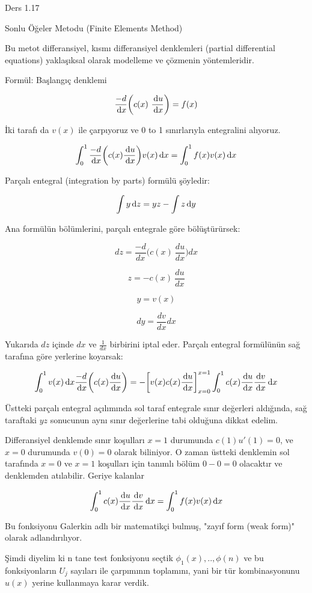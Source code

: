 \documentclass[12pt,fleqn]{article}\usepackage{../../common}
\begin{document}
Ders 1.17

Sonlu Öğeler Metodu (Finite Elements Method)

Bu metot differansiyel, kısmı differansiyel denklemleri (partial
differential equations) yaklaşıksal olarak modelleme ve çözmenin
yöntemleridir.

Formül: Başlangıç denklemi

$$ \frac{-d}{\,\mathrm{d} x} \bigg( c(x) \ \frac{\,\mathrm{d} u}{\,\mathrm{d} x} \bigg) = f(x) $$

İki tarafı da  $v(x)$ ile çarpıyoruz ve 0 to 1 sınırlarıyla entegralini alıyoruz.

$$
\int_0^1 \frac{-d}{\,\mathrm{d} x} \bigg( c(x) \frac{\,\mathrm{d} u}{\,\mathrm{d} x} \bigg) v(x)\,\mathrm{d} x
= \int_0^1 f(x)v(x) \,\mathrm{d} x
$$

Parçalı entegral (integration by parts) formülü şöyledir:

$$ \int y \,\mathrm{d} z = y  z - \int z \,\mathrm{d} y $$

Ana formülün bölümlerini, parçalı entegrale göre bölüştürürsek:

$$ dz = \frac{-d}{dx} \bigg( c(x) \ \frac{du}{dx} \bigg) dx  $$

$$ z = - c(x) \ \frac{du}{dx}  $$

$$ y = v(x)  $$

$$ dy = \frac{dv}{dx}dx $$

Yukarıda $dz$ içinde $dx$ ve $\frac{1}{dx}$ birbirini iptal eder. Parçalı
entegral formülünün sağ tarafına göre yerlerine koyarsak:

$$
\int_0^1 v(x)\,\mathrm{d} x \frac{-d}{\,\mathrm{d} x} \bigg( c(x) \frac{\,\mathrm{d} u}{\,\mathrm{d} x} \bigg)
= - \bigg[ v(x) c(x) \frac{\,\mathrm{d} u}{\,\mathrm{d} x} \bigg]_{x=0}^{x=1} \int_0^1 c(x) \frac{\,\mathrm{d} u}{\,\mathrm{d} x} \frac{\,\mathrm{d} v}{\,\mathrm{d} x} \,\mathrm{d} x
$$

Üstteki parçalı entegral açılımında sol taraf entegrale sınır
değerleri aldığında, sağ taraftaki $yz$ sonucunun aynı sınır
değerlerine tabi olduğuna dikkat edelim.

Differansiyel denklemde sınır koşulları $x=1$ durumunda $c(1)u'(1)=0$,
ve $x=0$ durumunda $v(0)=0$ olarak biliniyor. O zaman üstteki
denklemin sol tarafında $x=0$ ve $x=1$ koşulları için tanımlı bölüm $0
- 0 = 0$ olacaktır ve denklemden atılabilir. Geriye kalanlar

$$
\int_0^1 c(x) \frac{\,\mathrm{d} u}{\,\mathrm{d} x} \frac{\,\mathrm{d} v}{\,\mathrm{d} x} \,\mathrm{d} x
= \int_0^1 f(x)v(x) \,\mathrm{d} x
$$

Bu fonksiyonu Galerkin adlı bir matematikçi bulmuş, "zayıf form (weak
form)" olarak adlandırılıyor.

Şimdi diyelim ki n tane test fonksiyonu seçtik $\phi_1(x),..,\phi(n)$
ve bu fonksiyonların $U_j$ sayıları ile çarpımının toplamını, yani bir
tür kombinasyonunu $u(x)$ yerine kullanmaya karar verdik.
\end{document}
